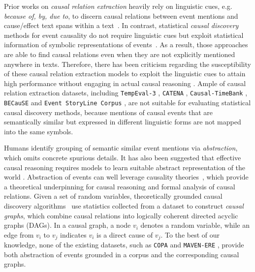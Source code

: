 Prior works on \textit{causal relation extraction} heavily rely on linguistic cues, e.g. \textit{because of, by, due to}, to discern causal relations between event mentions and cause/effect text spans within a text~\cite{wolff2003models, mirza-tonelli-2014-analysis}. In contrast, statistical \textit{causal discovery} methods for event causality do not require linguistic cues but exploit statistical information of symbolic representations of events~\cite{pearl2018book}. As a result, those approaches are able to find causal relations even when they are not explicitly mentioned anywhere in texts. Therefore, there has been criticism regarding the susceptibility of these causal relation extraction models to exploit the linguistic cues to attain high performance without engaging in actual causal reasoning
\citep{yang2022survey,li2022counterfactual}. Ample of causal relation extraction datasets, including \texttt{TempEval-3} \cite{mirza2014annotating}, \texttt{CATENA} \cite{mirza2016catena}, \texttt{Causal-TimeBank} \cite{mirza-tonelli-2014-analysis}, \texttt{BECauSE} \cite{dunietz2015annotating, dunietz2017because} and \texttt{Event StoryLine Corpus} \cite{caselli2017event}, are not suitable for evaluating statistical causal discovery methods, because mentions of causal events that are semantically similar but expressed in different linguistic forms are not mapped into the same symbols. %



Humans identify grouping of semantic similar event mentions via \textit{abstraction}, which omits concrete spurious details. It has also been suggested that effective causal reasoning requires models to learn suitable abstract representation of the world \citep{girju2003automatic}. Abstraction of events can well leverage causality theories~\citep{pearl2009causality}, which provide a theoretical underpinning for causal reasoning and formal analysis of causal relations. Given a set of random variables, theoretically grounded causal discovery algorithms~\cite{vowels2022d} use statistics collected from a dataset to construct \textit{causal graphs}, which combine causal relations into logically coherent directed acyclic graphs (DAGs). In a causal graph, a node $v_i$ denotes a random variable, while an edge from $v_i$ to $v_j$ indicates $v_i$ is a direct cause of $v_j$. To the best of our knowledge, none of the existing datasets, such as \texttt{COPA} \citep{roemmele2011choice} and \texttt{MAVEN-ERE} \citep{wang-etal-2022-maven}, %
provide both abstraction of events grounded in a corpus and the corresponding causal graphs.


